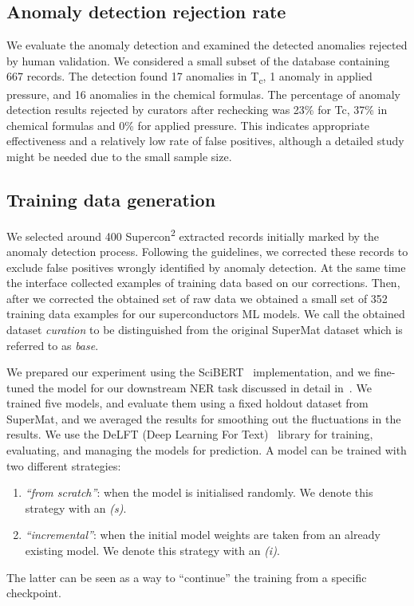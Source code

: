 \documentclass[a4paper]{article}
\begin{document}
\subsection{Anomaly detection rejection rate}
\label{subsec:anomaly-detection-evaluation}

We evaluate the anomaly detection and examined the detected anomalies rejected by human validation. 
We considered a small subset of the database containing 667 records. 
The detection found 17 anomalies in T\textsubscript{c}, 1 anomaly in applied pressure, and 16 anomalies in the chemical formulas. 
The percentage of anomaly detection results rejected by curators after rechecking was 23\% for Tc, 37\% in chemical formulas and 0\% for applied pressure. 
This indicates appropriate effectiveness and a relatively low rate of false positives, although a detailed study might be needed due to the small sample size.

\subsection{Training data generation}
\label{subsec:training-data-generation-evaluation}
We selected around 400 Supercon\textsuperscript{2} extracted records initially marked by the anomaly detection process. 
Following the guidelines, we corrected these records to exclude false positives wrongly identified by anomaly detection.  
At the same time the interface collected examples of training data based on our corrections. 
Then, after we corrected the obtained set of raw data we obtained a small set of 352 training data examples for our superconductors ML models. 
We call the obtained dataset \emph{curation} to be distinguished from the original SuperMat dataset which is referred to as \emph{base}.

We prepared our experiment using the SciBERT~\cite{Beltagy2019SciBERT} implementation, and we fine-tuned the model for our downstream NER task discussed in detail in~\cite{lfoppiano2023automatic}.
We trained five models, and evaluate them using a fixed holdout dataset from SuperMat, and we averaged the results for smoothing out the fluctuations in the results. 
We use the DeLFT (Deep Learning For Text)~\cite{DeLFT} library for training, evaluating, and managing the models for prediction.  
A model can be trained with two different strategies: 
\begin{enumerate}
    \item \emph{``from scratch''}: when the model is initialised randomly. We denote this strategy with an \emph{(s)}.
    \item \emph{``incremental''}: when the initial model weights are taken from an already existing model. We denote this strategy with an \emph{(i)}.
\end{enumerate}
The latter can be seen as a way to ``continue'' the training from a specific checkpoint.
\end{document}
